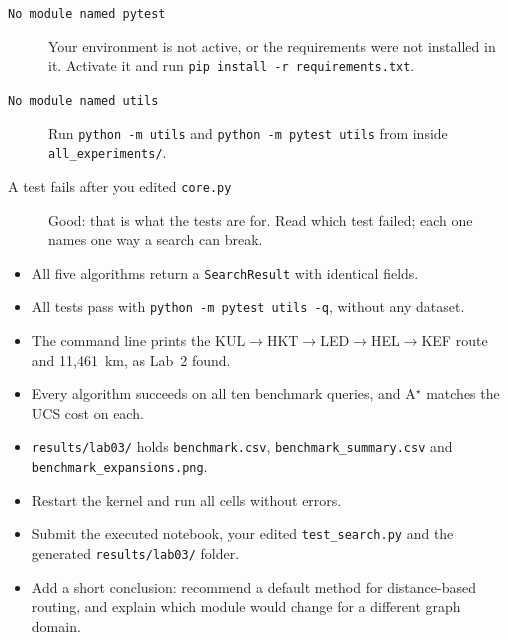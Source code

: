 \begin{troubleshoot}
\begin{description}
  \item[\texttt{No module named pytest}] Your environment is not active, or the requirements were not installed in it. Activate it and run \texttt{pip install -r requirements.txt}.
  \item[\texttt{No module named utils}] Run \texttt{python -m utils} and \texttt{python -m pytest utils} from inside \texttt{all\_experiments/}.
  \item[A test fails after you edited \texttt{core.py}] Good: that is what the tests are for. Read which test failed; each one names one way a search can break.
\end{description}
\end{troubleshoot}

\begin{verification}
\begin{itemize}
  \item All five algorithms return a \texttt{SearchResult} with identical fields.
  \item All tests pass with \texttt{python -m pytest utils -q}, without any dataset.
  \item The command line prints the KUL$\to$HKT$\to$LED$\to$HEL$\to$KEF route and 11,461~km, as Lab~2 found.
  \item Every algorithm succeeds on all ten benchmark queries, and A$^\star$ matches the UCS cost on each.
  \item \texttt{results/lab03/} holds \texttt{benchmark.csv}, \texttt{benchmark\_summary.csv} and \texttt{benchmark\_expansions.png}.
\end{itemize}
\end{verification}

\begin{labdeliverable}
\begin{itemize}
  \item Restart the kernel and run all cells without errors.
  \item Submit the executed notebook, your edited \texttt{test\_search.py} and the generated \texttt{results/lab03/} folder.
  \item Add a short conclusion: recommend a default method for distance-based routing, and explain which module would change for a different graph domain.
\end{itemize}
\end{labdeliverable}
